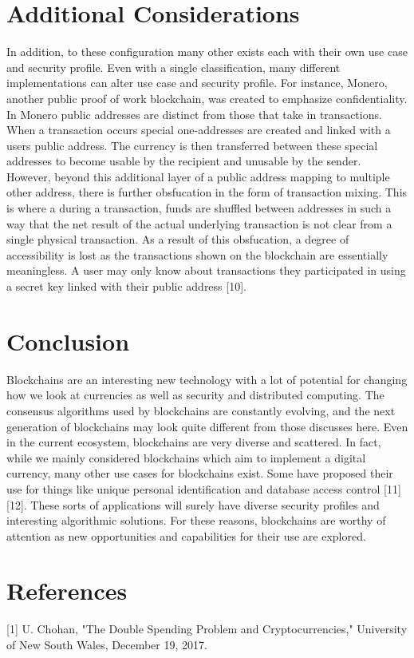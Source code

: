 \documentclass[11pt]{article}
\begin{document}
\section{Additional Considerations}
\label{sec:org1f4ae49}
In addition, to these configuration many other exists each with their own use case and security profile. Even with a single classification, many different implementations can alter use case and security profile. For instance, Monero, another public proof of work blockchain, was created to emphasize confidentiality. In Monero public addresses are distinct from those that take in transactions. When a transaction occurs special one-addresses are created and linked with a users public address. The currency is then transferred between these special addresses to become usable by the recipient and unusable by the sender. However, beyond this additional layer of a public address mapping to multiple other address, there is further obsfucation in the form of transaction mixing. This is where a during a transaction, funds are shuffled between addresses in such a way that the net result of the actual underlying transaction  is not clear from a single physical transaction. As a result of this obsfucation, a degree of accessibility is lost as the transactions shown on the blockchain are essentially meaningless. A user may only know about transactions they participated in using a secret key linked with their public address [10].
\section{Conclusion}
\label{sec:orge1da0f9}
Blockchains are an interesting new technology with a lot of potential for changing how we look at currencies as well as security and distributed computing. The consensus algorithms used by blockchains are constantly evolving, and the next generation of blockchains may look quite different from those discusses here. Even in the current ecosystem, blockchains are very diverse and scattered. In fact, while we mainly considered blockchains which aim to implement a digital currency, many other use cases for blockchains exist. Some have proposed their use for things like unique personal identification and database access control [11][12]. These sorts of applications will surely have diverse security profiles and interesting algorithmic solutions. For these reasons, blockchains are worthy of attention as new opportunities and capabilities for their use are explored. 

\section{References}
\label{sec:org1cb8da7}
[1] U. Chohan, "The Double Spending Problem and Cryptocurrencies," University of New South Wales, December 19, 2017.
\end{document}
